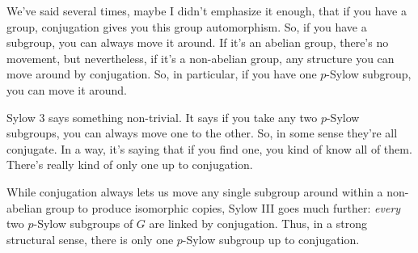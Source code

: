 \begin{content}
\end{content}

\begin{speech}[00:36:42 - 00:37:26]
We've said several times, maybe I didn't emphasize it enough, that if you have a group, conjugation gives you this group automorphism. So, if you have a subgroup, you can always move it around. If it's an abelian group, there's no movement, but nevertheless, if it's a non-abelian group, any structure you can move around by conjugation. So, in particular, if you have one $p$-Sylow subgroup, you can move it around.

Sylow $3$ says something non-trivial. It says if you take any two $p$-Sylow subgroups, you can always move one to the other. So, in some sense they're all conjugate. In a way, it's saying that if you find one, you kind of know all of them. There's really kind of only one up to conjugation.
\end{speech}

\begin{insight}
While conjugation always lets us move any single subgroup around within a non-abelian group to produce isomorphic copies, Sylow III goes much further: \emph{every} two $p$-Sylow subgroups of $G$ are linked by conjugation. Thus, in a strong structural sense, there is only one $p$-Sylow subgroup up to conjugation.
\end{insight}

